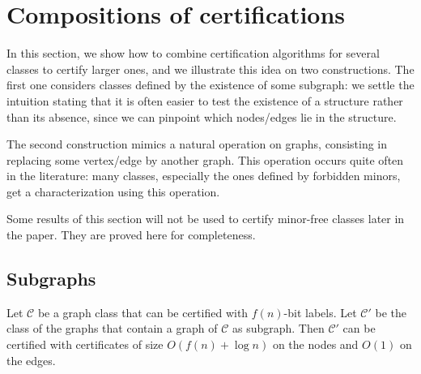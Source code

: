 \documentclass[a4paper,thm-restate,USenglish]{lipics-v2019}
\begin{document}
\section{Compositions of certifications}
\label{sec:composition}

In this section, we show how to combine certification algorithms for several classes to certify larger ones, and we illustrate this idea on two constructions. The first one considers classes defined by the existence of some subgraph: we settle the intuition stating that it is often easier to test the existence of a structure rather than its absence, since we can pinpoint which nodes/edges lie in the structure. 

The second construction mimics a natural operation on graphs, consisting in replacing some vertex/edge by another graph. This operation occurs quite often in the literature: many classes, especially the ones defined by forbidden minors, get a characterization using this operation.

Some results of this section will not be used to certify minor-free classes later in the paper. 
They are proved here for completeness.

\subsection{Subgraphs}

\begin{proposition}\label{prop:subgraph}
Let $\mathcal{C}$ be a graph class that can be certified with $f(n)$-bit labels.
Let $\mathcal{C}'$ be the class of the graphs that contain a graph of $\mathcal{C}$ as subgraph. 
Then $\mathcal{C}'$ can be certified with certificates of size $O(f(n)+\log n)$ on the nodes and $O(1)$ on the edges.
\end{proposition}
\end{document}
